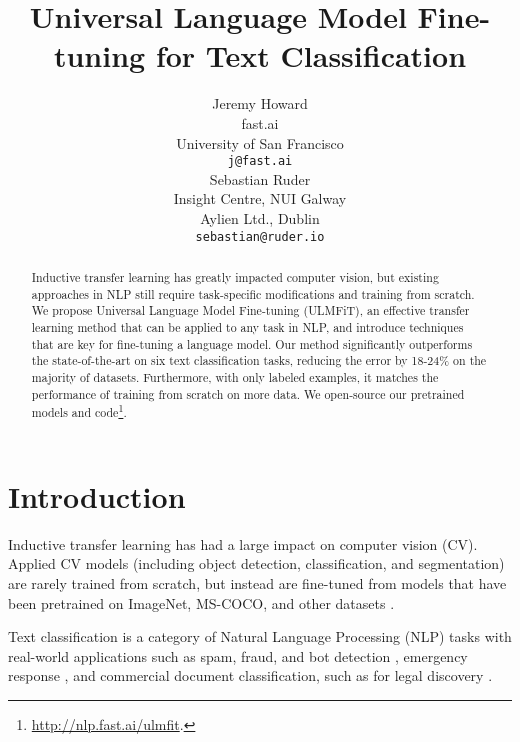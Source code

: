 \documentclass[11pt,a4paper]{article}
\title{Universal Language Model Fine-tuning for Text Classification}
\author{Jeremy Howard\footnotemark \\
  fast.ai \\
  University of San Francisco\\
  {\tt j@fast.ai} \\\And
  Sebastian Ruder\footnotemark[1] \\
  Insight Centre, NUI Galway \\
  Aylien Ltd., Dublin \\
  {\tt sebastian@ruder.io} \\}
\date{}
\begin{document}
\maketitle 
\begin{abstract}
Inductive transfer learning has greatly impacted computer vision, but existing approaches in NLP still require task-specific modifications and training from scratch. We propose Universal Language Model Fine-tuning (ULMFiT), an effective transfer learning method that can be applied to any task in NLP, and introduce techniques that are key for fine-tuning a language model. Our method significantly outperforms the state-of-the-art on six text classification tasks, reducing the error by 18-24\% on the majority of datasets. Furthermore, with only  labeled examples, it matches the performance of training from scratch on  more data. We open-source our pretrained models and code\footnote{\url{http://nlp.fast.ai/ulmfit}.}.
\end{abstract}

\newenvironment{starfootnotes}
  {\par\edef\savedfootnotenumber{\number\value{footnote}}
   \renewcommand{\thefootnote}{} 
   \setcounter{footnote}{0}}
  {\par\setcounter{footnote}{\savedfootnotenumber}}

\begin{starfootnotes}
\end{starfootnotes}

\section{Introduction}

Inductive transfer learning has had a large impact on computer vision (CV). Applied CV models (including object detection, classification, and segmentation) are rarely trained from scratch, but instead are fine-tuned from models that have been pretrained on ImageNet, MS-COCO, and other datasets \cite{sharif2014cnn,long2015fully,He2015,Huang2017}.

Text classification is a category of Natural Language Processing (NLP) tasks with real-world applications such as spam, fraud, and bot detection \cite{jindal2007review,ngai2011application,chu2012detecting}, emergency response \cite{caragea2011classifying}, and commercial document classification, such as for legal discovery \cite{roitblat2010document}.
\end{document}
